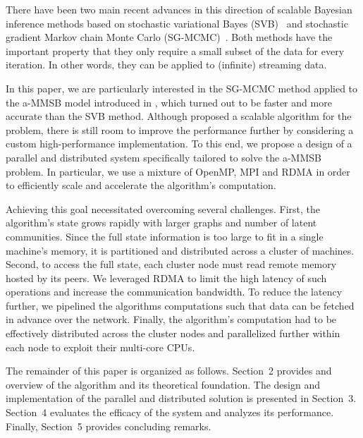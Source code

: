 There have been two main recent advances in this direction of scalable Bayesian inference methods based on stochastic variational Bayes (SVB)~\cite{hoffman2013stochastic,gopalan2013efficient,gopalan2012scalable} and stochastic gradient Markov chain Monte Carlo (SG-MCMC)~\cite{welling2011bayesian,patterson2013stochastic,ahn2014distributed,ahn2012bayesian}. Both methods have the important property that they only require a small subset of the data for every iteration. In other words, they can be applied to (infinite) streaming data.

In this paper, we are particularly interested in the SG-MCMC method applied to the a-MMSB model introduced in \cite{LiAW15}, which turned out to be faster and more accurate than the SVB method. Although \cite{LiAW15} proposed a scalable algorithm for the problem, there is still room to improve the performance further by considering a custom high-performance implementation. To this end, we propose a design of a parallel and distributed system specifically tailored to solve the a-MMSB problem. In particular, we use a mixture of OpenMP, MPI and RDMA in order to efficiently scale and accelerate the algorithm's computation.

Achieving this goal necessitated overcoming several challenges. First, the algorithm's state grows rapidly with larger graphs and number of latent communities. Since the full state information is too large to fit in a single machine's memory, it is partitioned and distributed across a cluster of machines. Second, to access the full state, each cluster node must read remote memory hosted by its peers. We leveraged RDMA to limit the high latency of such operations and increase the communication bandwidth. To reduce the latency further, we pipelined the algorithms computations such that data can be fetched in advance over the network. Finally, the algorithm's computation had to be effectively distributed across the cluster nodes and parallelized further within each node to exploit their multi-core CPUs.

The remainder of this paper is organized as follows. Section~2 provides and overview of the algorithm and its theoretical foundation. The design and implementation of the parallel and distributed solution is presented in Section~3. Section~4 evaluates the efficacy of the system and analyzes its performance. Finally, Section~5 provides concluding remarks.



